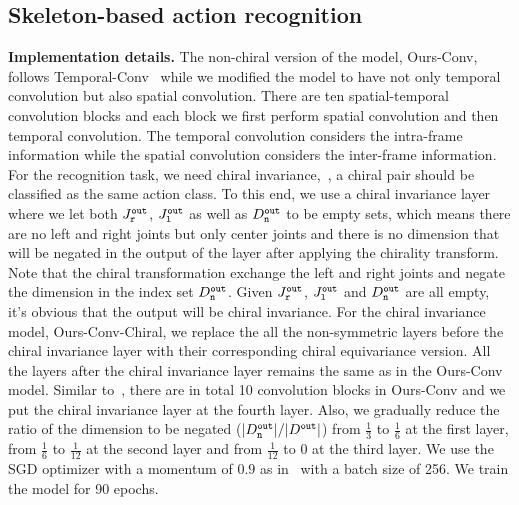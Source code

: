\documentclass{article}
\begin{document}
\subsection{Skeleton-based action recognition}
\textbf{Implementation details.}
The non-chiral version of the model, Ours-Conv, follows Temporal-Conv~\cite{kim2017interpretable} while we modified the model to have not only temporal convolution but also spatial convolution. There are ten spatial-temporal convolution blocks and each block we first perform spatial convolution and then temporal convolution. The temporal convolution considers the intra-frame information while the spatial convolution considers the inter-frame information. For the recognition task, we need chiral invariance,~\ie, a chiral pair should be classified as the same action class. To this end, we use a chiral invariance layer where we let both $J^{\tt out}_{\tt r}$, $J^{\tt out}_{\tt l}$ as well as $D^{\tt out}_{\tt n}$ to be empty sets, which means there are no left and right joints but only center joints and there is no dimension that will be negated in the output of the layer after applying the chirality transform. Note that the chiral transformation exchange the left and right joints and negate the dimension in the index set $D^{\tt out}_{\tt n}$. Given $J^{\tt out}_{\tt r}$, $J^{\tt out}_{\tt l}$ and $D^{\tt out}_{\tt n}$ are all empty, it's obvious that the output will be chiral invariance. For the chiral invariance model, Ours-Conv-Chiral, we replace the all the non-symmetric layers before the chiral invariance layer with their corresponding chiral equivariance version. All the layers after the chiral invariance layer remains the same as in the Ours-Conv model. Similar to~\cite{kim2017interpretable}, there are in total 10 convolution blocks in Ours-Conv and we put the chiral invariance layer at the fourth layer. Also, we gradually reduce the ratio of the dimension to be negated ($|{D^{\tt out}_{\tt n}}|/|{D^{\tt out}}|$) from $\frac{1}{3}$ to $\frac{1}{6}$ at the first layer, from $\frac{1}{6}$ to $\frac{1}{12}$ at the second layer and from $\frac{1}{12}$ to $0$ at the third layer. We use the SGD optimizer with a momentum of $0.9$ as in~\cite{yan2018stgcn} with a batch size of 256. We train the model for 90 epochs.

 
\end{document}
